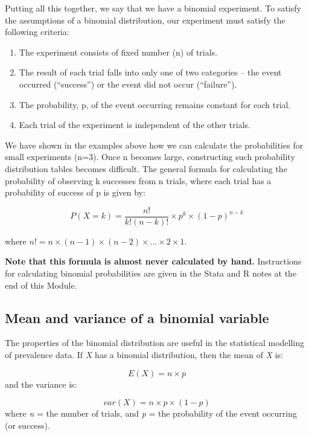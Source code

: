 \documentclass[
  a4paper,
]{memoir}
\providecommand{\tightlist}{%
  \setlength{\itemsep}{0pt}\setlength{\parskip}{0pt}}\usepackage{longtable,booktabs,array}
\begin{document}
Putting all this together, we say that we have a binomial experiment. To
satisfy the assumptions of a binomial distribution, our experiment must
satisfy the following criteria:

\begin{enumerate}
\def\labelenumi{\arabic{enumi}.}
\tightlist
\item
  The experiment consists of fixed number (n) of trials.
\item
  The result of each trial falls into only one of two categories -- the
  event occurred (``success'') or the event did not occur (``failure'').
\item
  The probability, p, of the event occurring remains constant for each
  trial.
\item
  Each trial of the experiment is independent of the other trials.
\end{enumerate}

We have shown in the examples above how we can calculate the
probabilities for small experiments (n=3). Once n becomes large,
constructing such probability distribution tables becomes difficult. The
general formula for calculating the probability of observing k successes
from n trials, where each trial has a probability of success of p is
given by:

\[ P(X=k) = \frac{n!}{k! (n-k)!} \times p^k \times (1-p)^{n-k} \]

where
\(n! = n \times (n-1) \times (n-2) \times \dots \times 2 \times 1\).

\textbf{Note that this formula is almost never calculated by hand.}
Instructions for calculating binomial probabilities are given in the
Stata and R notes at the end of this Module.

\hypertarget{mean-and-variance-of-a-binomial-variable}{%
\subsection{Mean and variance of a binomial
variable}\label{mean-and-variance-of-a-binomial-variable}}

The properties of the binomial distribution are useful in the
statistical modelling of prevalence data. If \emph{X} has a binomial
distribution, then the mean of \emph{X} is:

\[ E(X) = n \times p\] and the variance is:

\[ var(X) = n \times p \times (1-p) \] where \emph{n} = the number of
trials, and \emph{p} = the probability of the event occurring (or
success).
\end{document}
